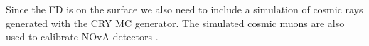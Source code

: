 


Since the \gls{FD} is on the surface we also need to include a simulation of cosmic rays generated with the CRY \cite{CRY} \gls{MC} generator. The simulated cosmic muons are also used to calibrate \gls{NOvA} detectors \cite{NuMIFlux.pdf}. 

